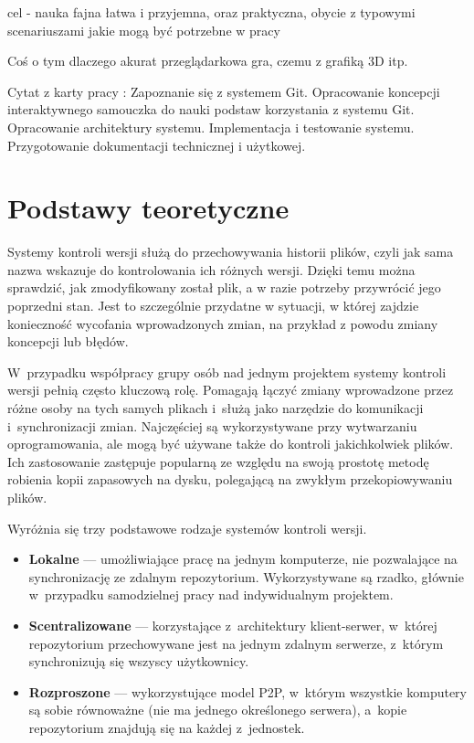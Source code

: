 \documentclass[12pt,a4paper,polish,thesis]{dcsbook}
\begin{document}
	cel - nauka fajna łatwa i przyjemna, oraz praktyczna, obycie z typowymi scenariuszami jakie mogą być potrzebne w pracy

	Coś o tym dlaczego akurat przeglądarkowa gra, czemu z grafiką 3D itp.

	Cytat z karty pracy : Zapoznanie się z systemem Git. Opracowanie koncepcji interaktywnego samouczka do nauki podstaw korzystania z systemu Git.  Opracowanie architektury systemu. Implementacja i testowanie systemu. Przygotowanie dokumentacji technicznej i użytkowej.

	\chapter{Podstawy teoretyczne}

	Systemy kontroli wersji służą do przechowywania historii plików, czyli jak sama nazwa wskazuje do kontrolowania ich różnych wersji. Dzięki temu można sprawdzić, jak zmodyfikowany został plik, a w razie potrzeby przywrócić jego poprzedni stan. Jest to szczególnie przydatne w sytuacji, w której zajdzie konieczność wycofania wprowadzonych zmian, na przykład z powodu zmiany koncepcji lub błędów.

	 W~przypadku współpracy grupy osób nad jednym projektem systemy kontroli wersji pełnią często kluczową rolę. Pomagają łączyć zmiany wprowadzone przez różne osoby na tych samych plikach i~służą jako narzędzie do komunikacji i~synchronizacji zmian. Najczęściej są wykorzystywane przy wytwarzaniu oprogramowania, ale mogą być używane także do kontroli jakichkolwiek plików. Ich zastosowanie zastępuje popularną ze względu na swoją prostotę metodę robienia kopii zapasowych na dysku, polegającą na zwykłym przekopiowywaniu plików.

	Wyróżnia się trzy podstawowe rodzaje systemów kontroli wersji.
	\begin{itemize}
		\item \textbf{Lokalne} --- umożliwiające pracę na jednym komputerze, nie pozwalające na synchronizację ze zdalnym repozytorium. Wykorzystywane są rzadko, głównie w~przypadku samodzielnej pracy nad indywidualnym projektem.
		\item \textbf{Scentralizowane} --- korzystające z~architektury klient-serwer, w~której repozytorium przechowywane jest na jednym zdalnym serwerze, z~którym synchronizują się wszyscy użytkownicy.
		\item \textbf{Rozproszone} --- wykorzystujące model P2P, w~którym wszystkie komputery są sobie równoważne (nie ma jednego określonego serwera), a~kopie repozytorium znajdują się na każdej z~jednostek.
	\end{itemize}
\end{document}
